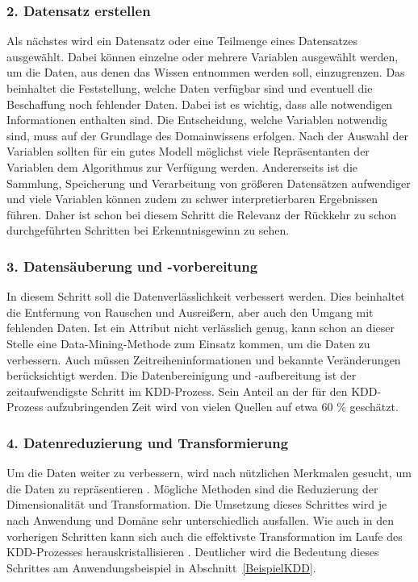 \subsubsection{2. Datensatz erstellen} %

Als nächstes wird ein Datensatz oder eine Teilmenge eines Datensatzes ausgewählt. Dabei können einzelne oder mehrere Variablen ausgewählt werden, um die Daten, aus denen das Wissen entnommen werden soll, einzugrenzen. \cite{Fayyad:1996} Das beinhaltet die Feststellung, welche Daten verfügbar sind und eventuell die Beschaffung noch fehlender Daten. Dabei ist es wichtig, dass alle notwendigen Informationen enthalten sind. Die Entscheidung, welche Variablen notwendig sind, muss auf der Grundlage des Domainwissens erfolgen. Nach der Auswahl der Variablen sollten für ein gutes Modell möglichst viele Repräsentanten der Variablen dem Algorithmus zur Verfügung werden. Andererseits ist die Sammlung, Speicherung und Verarbeitung von größeren Datensätzen aufwendiger und viele Variablen können zudem zu schwer interpretierbaren Ergebnissen führen. Daher ist schon bei diesem Schritt die Relevanz der Rückkehr zu schon durchgeführten Schritten bei Erkenntnisgewinn zu sehen.\cite{Maimon:2010}

\subsubsection{3. Datensäuberung und -vorbereitung} %

In diesem Schritt soll die Datenverlässlichkeit verbessert werden. Dies beinhaltet die Entfernung von Rauschen und Ausreißern, aber auch den Umgang mit fehlenden Daten. Ist ein Attribut nicht verlässlich genug, kann schon an dieser Stelle eine Data-Mining-Methode zum Einsatz kommen, um die Daten zu verbessern.\cite{Maimon:2010} Auch müssen Zeitreiheninformationen und bekannte Veränderungen berücksichtigt werden. \cite{Kurgan:2006} Die Datenbereinigung und -aufbereitung ist der zeitaufwendigste Schritt im KDD-Prozess. Sein Anteil an der für den KDD-Prozess aufzubringenden Zeit wird von vielen Quellen auf etwa 60 \% geschätzt.\cite{Kurgan:2006}

\subsubsection{4. Datenreduzierung und Transformierung} %

Um die Daten weiter zu verbessern, wird nach nützlichen Merkmalen gesucht, um die Daten zu repräsentieren \cite{Fayyad:1996}. Mögliche Methoden sind die Reduzierung der Dimensionalität und Transformation. Die Umsetzung dieses Schrittes wird je nach Anwendung und Domäne sehr unterschiedlich ausfallen. Wie auch in den vorherigen Schritten kann sich auch die effektivste Transformation im Laufe des KDD-Prozesses herauskristallisieren \cite{Maimon:2010}. Deutlicher wird die Bedeutung dieses Schrittes am Anwendungsbeispiel in Abschnitt~\ref{BeispielKDD}.

